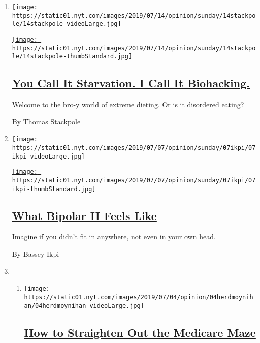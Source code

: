 \begin{enumerate}
\def\labelenumi{\arabic{enumi}.}
\item
  \texttt{[image: https://static01.nyt.com/images/2019/07/14/opinion/sunday/14stackpole/14stackpole-videoLarge.jpg]}

  \href{/2019/07/11/opinion/sunday/men-extreme-diets.html}{\texttt{[image: https://static01.nyt.com/images/2019/07/14/opinion/sunday/14stackpole/14stackpole-thumbStandard.jpg]}}

  \hypertarget{you-call-it-starvation-i-call-it-biohacking}{%
  \subsection{\texorpdfstring{\href{/2019/07/11/opinion/sunday/men-extreme-diets.html}{You
  Call It Starvation. I Call It
  Biohacking.}}{You Call It Starvation. I Call It Biohacking.}}\label{you-call-it-starvation-i-call-it-biohacking}}

  Welcome to the bro-y world of extreme dieting. Or is it disordered
  eating?

  By Thomas Stackpole
\item
  \texttt{[image: https://static01.nyt.com/images/2019/07/07/opinion/sunday/07ikpi/07ikpi-videoLarge.jpg]}

  \href{/2019/07/06/opinion/sunday/bipolar-bassey-ikpi-book.html}{\texttt{[image: https://static01.nyt.com/images/2019/07/07/opinion/sunday/07ikpi/07ikpi-thumbStandard.jpg]}}

  \hypertarget{what-bipolar-ii-feels-like}{%
  \subsection{\texorpdfstring{\href{/2019/07/06/opinion/sunday/bipolar-bassey-ikpi-book.html}{What
  Bipolar II Feels
  Like}}{What Bipolar II Feels Like}}\label{what-bipolar-ii-feels-like}}

  Imagine if you didn't fit in anywhere, not even in your own head.

  By Bassey Ikpi
\item
  \begin{enumerate}
  \def\labelenumii{\arabic{enumii}.}
  \item
    \texttt{[image: https://static01.nyt.com/images/2019/07/04/opinion/04herdmoynihan/04herdmoynihan-videoLarge.jpg]}

    \hypertarget{how-to-straighten-out-the-medicare-maze}{%
    \subsection{\texorpdfstring{\href{/2019/07/04/opinion/medicare-for-all.html}{How
    to Straighten Out the Medicare
    Maze}}{How to Straighten Out the Medicare Maze}}\label{how-to-straighten-out-the-medicare-maze}}


\end{enumerate}
\end{enumerate}

